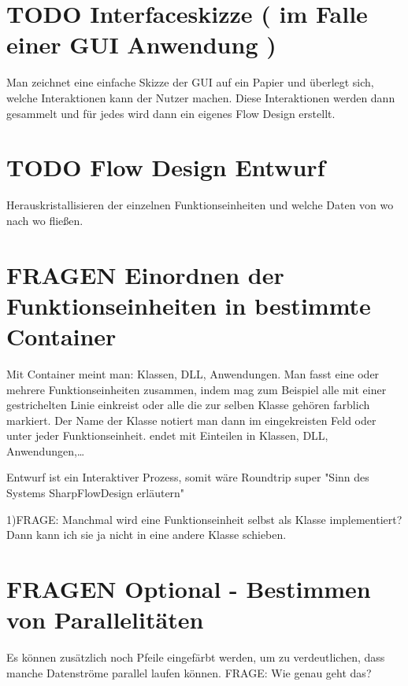 \documentclass[a4paper,12pt,oneside]{book}
\begin{document}
\section{{\bfseries\sffamily TODO} Interfaceskizze ( im Falle einer GUI Anwendung )}
\label{sec-5-2}
Man zeichnet eine einfache Skizze der GUI auf ein Papier und überlegt sich, welche Interaktionen kann der Nutzer machen.
Diese Interaktionen werden dann gesammelt und für jedes wird dann ein eigenes Flow Design erstellt.

\section{{\bfseries\sffamily TODO} Flow Design Entwurf}
\label{sec-5-3}
Herauskristallisieren der einzelnen Funktionseinheiten und welche Daten von wo nach wo fließen.

\section{FRAGEN Einordnen der Funktionseinheiten in bestimmte Container}
\label{sec-5-4}

Mit Container meint man: Klassen, DLL, Anwendungen.
Man fasst eine oder mehrere Funktionseinheiten zusammen, indem mag zum Beispiel alle mit einer gestrichelten Linie einkreist oder alle die zur selben Klasse
gehören farblich markiert. Der Name der Klasse notiert man dann im eingekreisten Feld oder unter jeder Funktionseinheit.
  endet mit Einteilen in Klassen, DLL, Anwendungen,\ldots{}

Entwurf ist ein Interaktiver Prozess, somit wäre Roundtrip super "Sinn des Systems SharpFlowDesign erläutern"

1)FRAGE: Manchmal wird eine Funktionseinheit selbst als Klasse implementiert? Dann kann ich sie ja nicht in eine andere Klasse schieben.

\section{FRAGEN Optional - Bestimmen von Parallelitäten}
\label{sec-5-5}
Es können zusätzlich noch Pfeile eingefärbt werden, um zu verdeutlichen, dass
manche Datenströme parallel laufen können.
FRAGE: Wie genau geht das?
\end{document}
